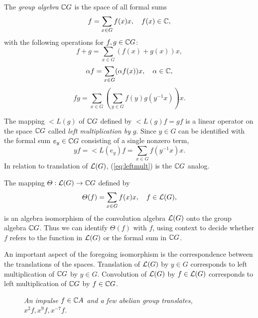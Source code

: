 \label{sec:groupalgebra}
The \emph{group algebra} $\mathbb{C} G$ is the space of all formal sums
\begin{equation}
f = \sum_{x\in G} f(x) x, \quad f(x) \in \mathbb{C},
\end{equation}
with the following operations for $f, g \in \mathbb{C} G$:
\begin{equation}
f+g = \sum_{x\in G} (f(x) + g(x))x,
\end{equation}
\begin{equation}
\alpha f = \sum_{x\in G} (\alpha f(x)) x, 
           \quad \alpha \in \mathbb{C},
\end{equation}
\begin{equation}
fg = \sum_{x\in G}\left(\sum_{y\in G} f(y)g(y^{-1}x)\right)x. 
\end{equation}

The mapping $\lt{L}(g)$ of $\mathbb{C} G$ defined by 
$\lt{L}(g)f = gf$
is a linear operator on the space $\mathbb{C} G$ called 
\emph{left multiplication by} $g$.  
Since $y\in G$ can be identified with the formal
sum $e_y \in \mathbb{C} G$ consisting of a single nonzero term,
\begin{equation}\label{eq:leftmult}
yf = \lt{L}(e_y)f = \sum_{x\in G}f(y^{-1}x) x.
\end{equation}
In relation to translation of $\mathcal{L}(G)$, (\ref{eq:leftmult}) is the
$\mathbb{C} G$ analog. 

The mapping $\varTheta: \mathcal{L}(G) \to \mathbb{C} G$ defined by
\begin{equation}\label{eq:iso}
\varTheta(f) = \sum_{x\in G} f(x) x, \quad f\in \mathcal{L}(G),
\end{equation}
is an algebra isomorphism of the convolution algebra $\mathcal{L}(G)$
onto the group algebra $\mathbb{C} G$.  
Thus we can identify
$\varTheta(f)$ with $f$, using  context to decide whether
$f$ refers to the function in $\mathcal{L}(G)$ or the formal sum in
$\mathbb{C} G$.  

An important aspect of the foregoing isomorphism is the
correspondence between the translations of the spaces.
Translation of $\mathcal{L}(G)$ by $y\in G$ %
corresponds to left multiplication of $\mathbb{C} G$ by $y\in G$.
Convolution of $\mathcal{L}(G)$ by $f\in \mathcal{L}(G)$ corresponds to
left multiplication of $\mathbb{C} G$ by $f\in \mathbb{C} G$. 

\begin{figure}
  \centerline{}
  \caption{{\small {\it An impulse
      $f\in \mathbb{C} A$ and a few abelian group translates, $x^2f, x^9f,
      x^{-7}f$. }}}
  \label{fig:cyclicshift}
\end{figure}


